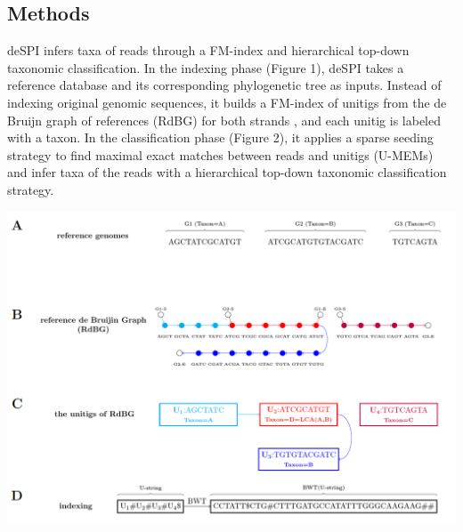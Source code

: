\documentclass[a0,portrait]{a0poster}
\begin{document}
\begin{multicols}{2}
\section*{Methods}
deSPI infers taxa of reads through a FM-index and hierarchical top-down taxonomic classification. In the indexing phase (Figure 1), deSPI takes a reference database and its corresponding phylogenetic tree as inputs. Instead of indexing original genomic sequences, it builds a FM-index of unitigs from the de Bruijn graph of references (RdBG) for both strands \cite{Liu2016-vy}, and each unitig is labeled with a taxon. In the classification phase (Figure 2), it applies a sparse seeding strategy to find maximal exact matches between reads and unitigs (U-MEMs) and infer taxa of the reads with a hierarchical top-down taxonomic classification strategy. 

\begin{center}\vspace{1cm}
\includegraphics[width=0.7\linewidth]{irg1}
\end{center}\vspace{1cm}


\end{multicols}
\end{document}
